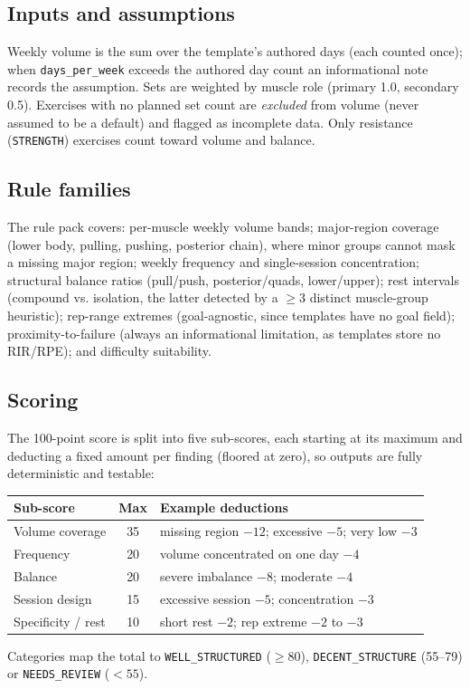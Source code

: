 \documentclass[11pt,a4paper]{article}
\begin{document}
\subsection{Inputs and assumptions}
Weekly volume is the sum over the template's authored days (each counted once); when
\verb|days_per_week| exceeds the authored day count an informational note records the assumption.
Sets are weighted by muscle role (primary 1.0, secondary 0.5). Exercises with no planned set count
are \emph{excluded} from volume (never assumed to be a default) and flagged as incomplete data.
Only resistance (\verb|STRENGTH|) exercises count toward volume and balance.

\subsection{Rule families}
The rule pack covers: per-muscle weekly volume bands; major-region coverage (lower body, pulling,
pushing, posterior chain), where minor groups cannot mask a missing major region; weekly frequency
and single-session concentration; structural balance ratios (pull/push, posterior/quads,
lower/upper); rest intervals (compound vs. isolation, the latter detected by a $\geq 3$ distinct
muscle-group heuristic); rep-range extremes (goal-agnostic, since templates have no goal field);
proximity-to-failure (always an informational limitation, as templates store no RIR/RPE); and
difficulty suitability.

\subsection{Scoring}
The 100-point score is split into five sub-scores, each starting at its maximum and deducting a
fixed amount per finding (floored at zero), so outputs are fully deterministic and testable:
\begin{center}
\begin{tabular}{@{}lc l@{}}
\toprule
Sub-score & Max & Example deductions \\
\midrule
Volume coverage & 35 & missing region $-12$; excessive $-5$; very low $-3$ \\
Frequency & 20 & volume concentrated on one day $-4$ \\
Balance & 20 & severe imbalance $-8$; moderate $-4$ \\
Session design & 15 & excessive session $-5$; concentration $-3$ \\
Specificity / rest & 10 & short rest $-2$; rep extreme $-2$ to $-3$ \\
\bottomrule
\end{tabular}
\end{center}
Categories map the total to \verb|WELL_STRUCTURED| ($\geq 80$), \verb|DECENT_STRUCTURE| (55--79) or
\verb|NEEDS_REVIEW| ($<55$).
\end{document}
